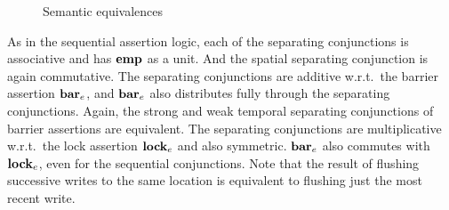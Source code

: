 \documentclass[11pt]{report}
\begin{document}
\begin{figure}[ht]
	\centering
	\caption{\label{fig:equivalences}Semantic equivalences}
\end{figure}

As in the sequential assertion logic, each of the separating conjunctions is associative and has $\mathbf{emp}$ as a unit. And the spatial separating conjunction is again commutative. The separating conjunctions are additive w.r.t.\ the barrier assertion $\mathbf{bar}_{e}$, and $\mathbf{bar}_{e}$ also distributes fully through the separating conjunctions. Again, the strong and weak temporal separating conjunctions of barrier assertions are equivalent. The separating conjunctions are multiplicative w.r.t.\ the lock assertion $\mathbf{lock}_{e}$ and also symmetric. $\mathbf{bar}_{e}$ also commutes with $\mathbf{lock}_{e}$, even for the sequential conjunctions. Note that the result of flushing successive writes to the same location is equivalent to flushing just the most recent write. 
\end{document}
